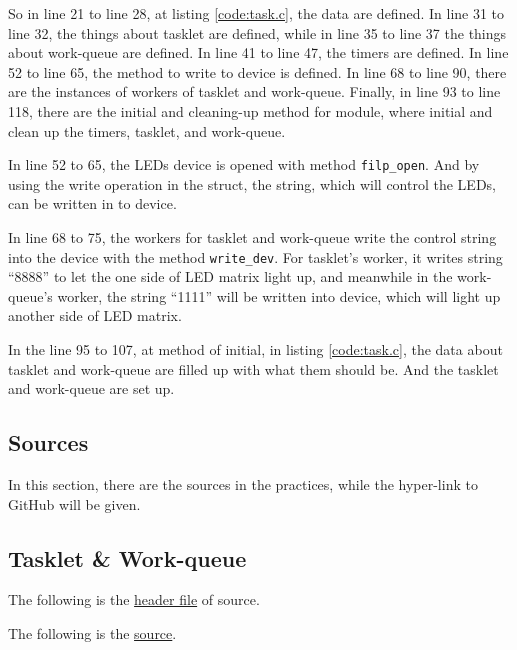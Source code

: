 \documentclass{report}
\begin{document}
    So in line 21 to line 28, at listing \ref{code:task.c}, the data are defined.
    In line 31 to line 32, the things about tasklet are defined,
    while in line 35 to line 37 the things about work-queue are defined.
    In line 41 to line 47, the timers are defined.
    In line 52 to line 65, the method to write to device is defined.
    In line 68 to line 90, there are the instances of workers of tasklet and work-queue.
    Finally, in line 93 to line 118, there are the initial and cleaning-up method
    for module, where initial and clean up the timers, tasklet, and work-queue.
    
    In line 52 to 65, the LEDs device is opened with method \lstinline|filp_open|.
    And by using the write operation in the struct, the string, which will control
    the LEDs, can be written in to device.
    
    In line 68 to 75, the workers for tasklet and work-queue write the control string
    into the device with the method \lstinline|write_dev|. For tasklet's worker,
    it writes string ``8888'' to let the one side of LED matrix light up,
    and meanwhile in the work-queue's worker, the string ``1111'' will be written into
    device, which will light up another side of LED matrix.
    
    In the line 95 to 107, at method of initial, in listing \ref{code:task.c},
    the data about tasklet and work-queue are filled up with what them should be.
    And the tasklet and work-queue are set up.
    
    
    \begin{appendix}
        \chapter{Sources}
        \label{achap:source}
        
        In this section, there are the sources in the practices, while the hyper-link to GitHub will be given.
        
        \section{Tasklet \& Work-queue}
        \label{src:tnw}
        
        The following is the
        \href{https://github.com/Qinka/embedded-system-design-homework/blob/master/practice3/task.h}{header file}
        of source.
        
        
        The following is the \href{https://github.com/Qinka/embedded-system-design-homework/blob/master/practice3/task.c}{source}.
        
    \end{appendix}
    
\end{document}

